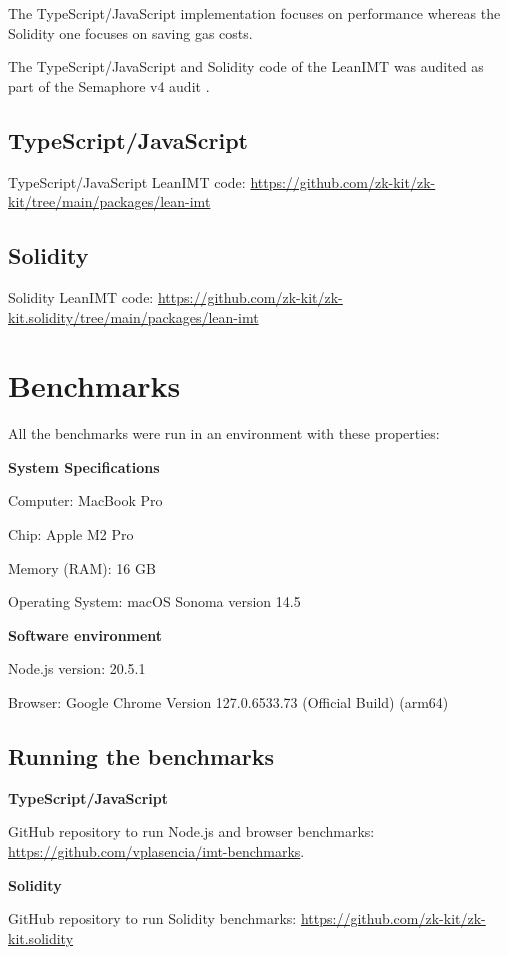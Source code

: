 \documentclass{article}
\begin{document}
The TypeScript/JavaScript implementation focuses on performance whereas the Solidity one focuses on saving gas costs.

The TypeScript/JavaScript and Solidity code of the LeanIMT was audited as part of the Semaphore v4 audit \cite{semaphore_v4_audit_report}.


\subsection{TypeScript/JavaScript}

TypeScript/JavaScript LeanIMT code: \url{https://github.com/zk-kit/zk-kit/tree/main/packages/lean-imt}


\subsection{Solidity}

Solidity LeanIMT code: \url{https://github.com/zk-kit/zk-kit.solidity/tree/main/packages/lean-imt}


\section{Benchmarks}

All the benchmarks were run in an environment with these properties:

\textbf{System Specifications}

Computer: MacBook Pro

Chip: Apple M2 Pro

Memory (RAM): 16 GB

Operating System: macOS Sonoma version 14.5

\textbf{Software environment}

Node.js version: 20.5.1

Browser: Google Chrome Version 127.0.6533.73 (Official Build) (arm64)


\subsection{Running the benchmarks}

\textbf{TypeScript/JavaScript}

GitHub repository to run Node.js and browser benchmarks: \url{https://github.com/vplasencia/imt-benchmarks}.

\textbf{Solidity}

GitHub repository to run Solidity benchmarks: \url{https://github.com/zk-kit/zk-kit.solidity}
\end{document}
